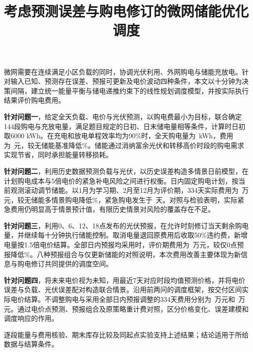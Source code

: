 \documentclass[withoutpreface,notoc,bwprint]{cumcmthesis}
\title{考虑预测误差与购电修订的微网储能优化调度}
\renewenvironment{abstract}{%
  \begin{center}{\zihao{3}\bfseries\abstractname}\end{center}%
  \zihao{-4}\songti\setlength{\parindent}{2em}%
}{\par}
\begin{document}
\maketitle
\begin{abstract}
微网需要在连续满足小区负载的同时，协调光伏利用、外网购电与储能充放电。针对输入已知、预测存在误差、预报可更新及电价波动四种条件，本文以十分钟为决策间隔，建立统一能量平衡与储电递推约束下的线性规划调度模型，并按实际执行结果评价购电费用。

\textbf{针对问题一}，给定全天负载、电价与光伏预测，以购电费最小为目标，联合确定144段购电与充放电量，满足题目规定的日初、日末储电量相等条件，计算时日初取6000 kWh。在充电和放电单程效率均为90\%时，全天购电量为\QoneGrid\ kWh，费用为\QoneCost\ 元，较无储能基准降低\SavingPercent\%。储能通过消纳富余光伏和转移高价时段的购电需求实现节省，同时承担能量转移损耗。

\textbf{针对问题二}，利用历史数据预测负载与光伏，以历史误差构造多情景日前模型，在计划购电成本与5倍电价的紧急补电风险之间进行权衡。日内固定购电计划，按当前观测滚动调节储能。以1月为学习期、2月至12月为评价期，334天实际费用为\QtwoCost\ 万元，较无储能多情景购电降低\QtwoNoStorageSaving\%，紧急购电发生于\QtwoDays\ 天。对照与检验表明，实际紧急费用仍明显高于情景预计值，有限历史情景对风险的覆盖存在不足。

\textbf{针对问题三}，利用0、6、12、18点发布的光伏预报，在允许时刻修订当天剩余购电量，并继续每十分钟执行储能控制。取消电量退回原费用后收取50\%违约费，新增电量按1.5倍电价结算。全部日内预报均采用时，评价期费用为\QthreeCost\ 万元，较仅0点预报降低\QthreeSaving\%。八种预报组合与仅更新储能的对照说明，本次费用改善主要体现为新信息与购电修订共同提供的调度空间。

\textbf{针对问题四}，将未来电价视为未知，用最近7天对应时段均值预测价格，并将电价误差与负载、光伏误差配对构造联合情景。沿用前两问的调度框架，按交付区间实际电价结算。不调整购电与采用全部日内预报调整的334天费用分别为\QfourTwoCost\ 万元和\QfourThreeCost\ 万元。通过电价点预测、预报组合及原策略重计费对照，区分价格变化、误差建模和调度响应的作用。

逐段能量与费用核验、期末库存比较及同起点实验支持上述结果；结论适用于所给数据与结算条件。
\end{abstract}


\FloatBarrier

\FloatBarrier

\FloatBarrier

\FloatBarrier



\end{document}
